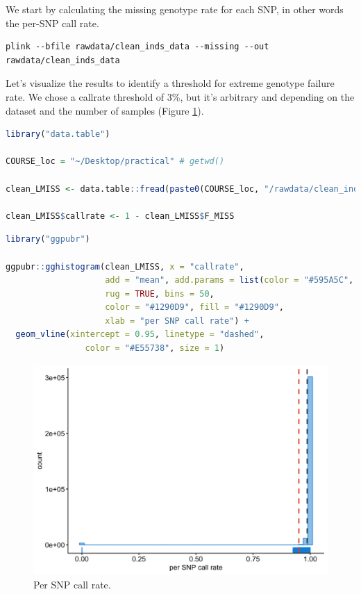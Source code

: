 \documentclass[
]{book}
\begin{document}
We start by calculating the missing genotype rate for each SNP, in other words the per-SNP call rate.

\begin{lstlisting}
plink --bfile rawdata/clean_inds_data --missing --out rawdata/clean_inds_data
\end{lstlisting}

Let's visualize the results to identify a threshold for extreme genotype failure rate. We chose a callrate threshold of 3\%, but it's arbitrary and depending on the dataset and the number of samples (Figure \ref{fig:show-snp-callrate}).

\begin{lstlisting}[language=R]
library("data.table")

COURSE_loc = "~/Desktop/practical" # getwd()

clean_LMISS <- data.table::fread(paste0(COURSE_loc, "/rawdata/clean_inds_data.lmiss"))

clean_LMISS$callrate <- 1 - clean_LMISS$F_MISS
\end{lstlisting}

\begin{lstlisting}[language=R]
library("ggpubr")

ggpubr::gghistogram(clean_LMISS, x = "callrate",
                    add = "mean", add.params = list(color = "#595A5C", linetype = "dashed", size = 1),
                    rug = TRUE, bins = 50,
                    color = "#1290D9", fill = "#1290D9",
                    xlab = "per SNP call rate") +
  geom_vline(xintercept = 0.95, linetype = "dashed",
                color = "#E55738", size = 1)
\end{lstlisting}

\begin{figure}

{\centering \includegraphics[width=18.67in]{img/_gwas/show-snp-callrate} 

}

\caption{Per SNP call rate.}\label{fig:show-snp-callrate}
\end{figure}
\end{document}
